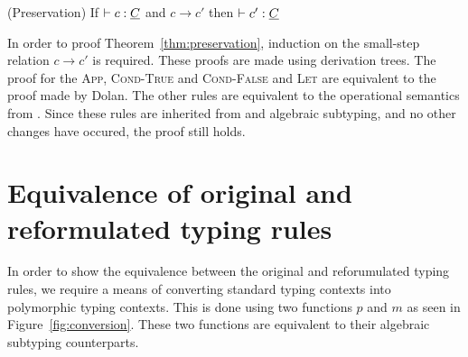\begin{theorem}
\label{thm:preservation:2}
(Preservation) If $\vdash c \mathrel{:} \underline{C}$ and $c \longrightarrow c'$ then $\vdash c' \mathrel{:} \underline{C}$
\end{theorem}

In order to proof Theorem~\ref{thm:preservation}, induction on the small-step relation $c \longrightarrow c'$ is required. These proofs are made using derivation trees. The proof for the \textsc{App}, \textsc{Cond-True} and \textsc{Cond-False} and \textsc{Let} are equivalent to the proof made by Dolan. The other rules are equivalent to the operational semantics from \eff \cite{inferring}. Since these rules are inherited from \eff and algebraic subtyping, and no other changes have occured, the proof still holds.



\chapter{Equivalence of original and reformulated typing rules}\label{equivalence-reform-rules}
In order to show the equivalence between the original and reforumulated typing rules, we require a means of converting standard typing contexts into polymorphic typing contexts. This is done using two functions $p$ and $m$ as seen in Figure~\ref{fig:conversion}. These two functions are equivalent to their algebraic subtyping counterparts.

